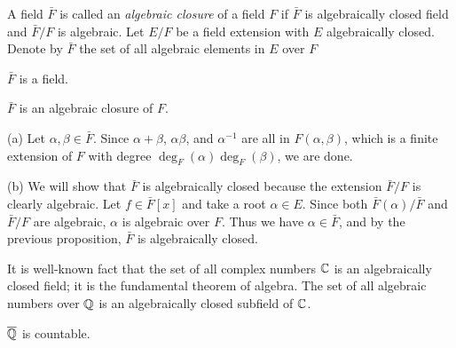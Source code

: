 \documentclass{../note}
\begin{document}
\begin{prb}
A field $\bar F$ is called an \emph{algebraic closure} of a field $F$ if $\bar F$ is algebraically closed field and $\bar F/F$ is algebraic.
Let $E/F$ be a field extension with $E$ algebraically closed.
Denote by $\bar F$ the set of all algebraic elements in $E$ over $F$
\begin{parts}
\item $\bar F$ is a field.
\item $\bar F$ is an algebraic closure of $F$.
\end{parts}
\end{prb}
\begin{pf}
(a)
Let $\alpha,\beta\in\bar F$.
Since $\alpha+\beta$, $\alpha\beta$, and $\alpha^{-1}$ are all in $F(\alpha,\beta)$, which is a finite extension of $F$ with degree $\deg_F(\alpha)\deg_F(\beta)$, we are done.

(b)
We will show that $\bar F$ is algebraically closed because the extension $\bar F/F$ is clearly algebraic.
Let $f\in\bar F[x]$ and take a root $\alpha\in E$.
Since both $\bar F(\alpha)/\bar F$ and $\bar F/F$ are algebraic, $\alpha$ is algebraic over $F$.
Thus we have $\alpha\in\bar F$, and by the previous proposition, $\bar F$ is algebraically closed.
\end{pf}

\begin{prb}
It is well-known fact that the set of all complex numbers $\mathbb{C}$ is an algebraically closed field; it is the fundamental theorem of algebra.
The set of all algebraic numbers over $\mathbb{Q}$ is an algebraically closed subfield of $\mathbb{C}$.
\begin{parts}
\item $\overline{\mathbb{Q}}$ is countable.
\end{parts}
\end{prb}
\end{document}
